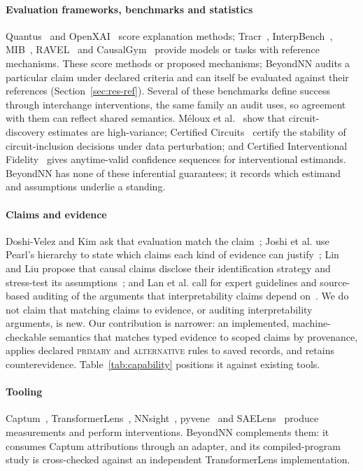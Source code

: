 \paragraph*{Evaluation frameworks, benchmarks and statistics}
Quantus~\cite{hedstrom2023quantus} and OpenXAI~\cite{agarwal2022openxai} score explanation methods; Tracr~\cite{lindner2023tracr}, InterpBench~\cite{gupta2024interpbench}, MIB~\cite{mueller2025mib}, RAVEL~\cite{huang2024ravel} and CausalGym~\cite{arora2024causalgym} provide models or tasks with reference mechanisms. These score methods or proposed mechanisms; BeyondNN audits a particular claim under declared criteria and can itself be evaluated against their references (Section~\ref{sec:res-ref}). Several of these benchmarks define success through interchange interventions, the same family an audit uses, so agreement with them can reflect shared semantics. M\'eloux et al.~\cite{meloux2026variance} show that circuit-discovery estimates are high-variance; Certified Circuits~\cite{anani2026certified} certify the stability of circuit-inclusion decisions under data perturbation; and Certified Interventional Fidelity~\cite{asiaee2026cif} gives anytime-valid confidence sequences for interventional estimands. BeyondNN has none of these inferential guarantees; it records which estimand and assumptions underlie a standing.

\paragraph*{Claims and evidence}
Doshi-Velez and Kim ask that evaluation match the claim~\cite{doshivelez2017rigorous}; Joshi et al. use Pearl's hierarchy to state which claims each kind of evidence can justify~\cite{joshi2026causality}; Lin and Liu propose that causal claims disclose their identification strategy and stress-test its assumptions~\cite{lin2026identification}; and Lan et al. call for expert guidelines and source-based auditing of the arguments that interpretability claims depend on~\cite{lan2026auditable}. We do not claim that matching claims to evidence, or auditing interpretability arguments, is new. Our contribution is narrower: an implemented, machine-checkable semantics that matches typed evidence to scoped claims by provenance, applies declared \textsc{primary} and \textsc{alternative} rules to saved records, and retains counterevidence. Table~\ref{tab:capability} positions it against existing tools.

\paragraph*{Tooling}
Captum~\cite{kokhlikyan2020captum}, TransformerLens~\cite{nanda2022transformerlens}, NNsight~\cite{fiottokaufman2025nnsight}, pyvene~\cite{wu2024pyvene} and SAELens~\cite{bloom2024saelens} produce measurements and perform interventions. BeyondNN complements them: it consumes Captum attributions through an adapter, and its compiled-program study is cross-checked against an independent TransformerLens implementation.
